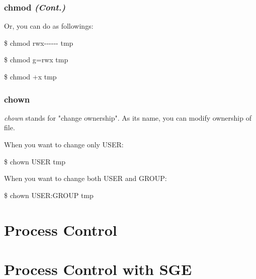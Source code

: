 \documentclass{beamer}
\begin{document}
	\begin{frame}
		\frametitle{chmod \textit{(Cont.)}}
		Or, you can do as followings:
		
		\begin{example}
			\$ chmod rwx-$ $-$ $-$ $-$ $-$ $- tmp
		\end{example}
	
		\begin{example}
			\$ chmod g=rwx tmp
		\end{example}
	
		\begin{example}
			\$ chmod +x tmp
		\end{example}
	\end{frame}

	\begin{frame}
		\frametitle{chown}
		\textit{chown} stands for "change ownership". As its name, you can modify ownership of file.
		
		When you want to change only USER:
		\begin{example}
			\$ chown USER tmp
		\end{example}
	
		When you want to change both USER and GROUP:
		\begin{example}
			\$ chown USER:GROUP tmp
		\end{example}
	\end{frame}
	
	\section{Process Control}
	
	\section{Process Control with SGE}
\end{document}
